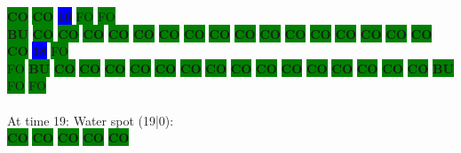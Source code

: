 \colorbox{green}{\color[rgb]{0,0,0}\textbf{CO}}%
\colorbox{green}{\color[rgb]{0,0,0}\textbf{CO}}%
\colorbox{blue}{\color[rgb]{1,0,0}\textbf{16}}%
\colorbox{green}{\color[gray]{0.75}FO}%
\colorbox{green}{\color[gray]{0.75}FO}%
\\
\colorbox{green}{\color[rgb]{1,0,0}\textbf{BU}}%
\colorbox{green}{\color[rgb]{0,0,0}\textbf{CO}}%
\colorbox{green}{\color[rgb]{0,0,0}\textbf{CO}}%
\colorbox{green}{\color[rgb]{0,0,0}\textbf{CO}}%
\colorbox{green}{\color[rgb]{0,0,0}\textbf{CO}}%
\colorbox{green}{\color[rgb]{0,0,0}\textbf{CO}}%
\colorbox{green}{\color[rgb]{0,0,0}\textbf{CO}}%
\colorbox{green}{\color[rgb]{0,0,0}\textbf{CO}}%
\colorbox{green}{\color[rgb]{0,0,0}\textbf{CO}}%
\colorbox{green}{\color[rgb]{0,0,0}\textbf{CO}}%
\colorbox{green}{\color[rgb]{0,0,0}\textbf{CO}}%
\colorbox{green}{\color[rgb]{0,0,0}\textbf{CO}}%
\colorbox{green}{\color[rgb]{0,0,0}\textbf{CO}}%
\colorbox{green}{\color[rgb]{0,0,0}\textbf{CO}}%
\colorbox{green}{\color[rgb]{0,0,0}\textbf{CO}}%
\colorbox{green}{\color[rgb]{0,0,0}\textbf{CO}}%
\colorbox{green}{\color[rgb]{0,0,0}\textbf{CO}}%
\colorbox{green}{\color[rgb]{0,0,0}\textbf{CO}}%
\colorbox{blue}{\color[rgb]{1,0,0}\textbf{18}}%
\colorbox{green}{\color[gray]{0.75}FO}%
\\
\colorbox{green}{\color[gray]{0.75}FO}%
\colorbox{green}{\color[rgb]{1,0,0}\textbf{BU}}%
\colorbox{green}{\color[rgb]{0,0,0}\textbf{CO}}%
\colorbox{green}{\color[rgb]{0,0,0}\textbf{CO}}%
\colorbox{green}{\color[rgb]{0,0,0}\textbf{CO}}%
\colorbox{green}{\color[rgb]{0,0,0}\textbf{CO}}%
\colorbox{green}{\color[rgb]{0,0,0}\textbf{CO}}%
\colorbox{green}{\color[rgb]{0,0,0}\textbf{CO}}%
\colorbox{green}{\color[rgb]{0,0,0}\textbf{CO}}%
\colorbox{green}{\color[rgb]{0,0,0}\textbf{CO}}%
\colorbox{green}{\color[rgb]{0,0,0}\textbf{CO}}%
\colorbox{green}{\color[rgb]{0,0,0}\textbf{CO}}%
\colorbox{green}{\color[rgb]{0,0,0}\textbf{CO}}%
\colorbox{green}{\color[rgb]{0,0,0}\textbf{CO}}%
\colorbox{green}{\color[rgb]{0,0,0}\textbf{CO}}%
\colorbox{green}{\color[rgb]{0,0,0}\textbf{CO}}%
\colorbox{green}{\color[rgb]{0,0,0}\textbf{CO}}%
\colorbox{green}{\color[rgb]{1,0,0}\textbf{BU}}%
\colorbox{green}{\color[gray]{0.75}FO}%
\colorbox{green}{\color[gray]{0.75}FO}%
\\
\\
At time 19: Water spot (19|0):
\\
\colorbox{green}{\color[rgb]{0,0,0}\textbf{CO}}%
\colorbox{green}{\color[rgb]{0,0,0}\textbf{CO}}%
\colorbox{green}{\color[rgb]{0,0,0}\textbf{CO}}%
\colorbox{green}{\color[rgb]{0,0,0}\textbf{CO}}%
\colorbox{green}{\color[rgb]{0,0,0}\textbf{CO}}%
